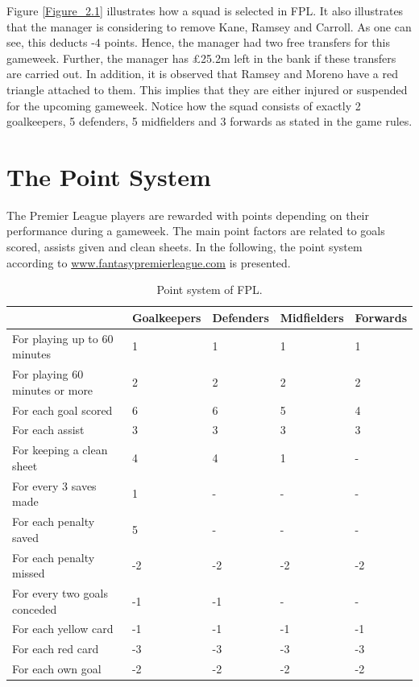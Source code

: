 Figure \ref{Figure_2.1} illustrates how a squad is selected in FPL. It also illustrates that the manager is considering to remove Kane, Ramsey and Carroll. As one can see, this deducts -4 points. Hence, the manager had two free transfers for this gameweek. Further, the manager has \pounds 25.2m left in the bank if these transfers are carried out. In addition, it is observed that Ramsey and Moreno have a red triangle attached to them. This implies that they are either injured or suspended for the upcoming gameweek. Notice how the squad consists of exactly 2 goalkeepers, 5 defenders, 5 midfielders and 3 forwards as stated in the game rules. 


\section{The Point System} \label{point_system}
The Premier League players are rewarded with points depending on their performance during a gameweek. The main point factors are related to goals scored, assists given and clean sheets. In the following, the point system according to \url{www.fantasypremierleague.com} is presented. 

\begin{table}[H]
\centering
\small
\begin{tabular}{|l|l|l|l|l|}
\hline
                               & Goalkeepers & Defenders & Midfielders & Forwards \\
\hline
For playing up to 60 minutes   & 1           & 1         & 1           & 1        \\
For playing 60 minutes or more & 2           & 2         & 2           & 2        \\
For each goal scored           & 6           & 6         & 5           & 4        \\
For each assist                & 3           & 3         & 3           & 3        \\
For keeping a clean sheet      & 4           & 4         & 1           & -        \\
For every 3 saves made         & 1           & -         & -           & -        \\
For each penalty saved         & 5           & -         & -           & -        \\
For each penalty missed        & -2          & -2        & -2          & -2       \\
For every two goals conceded   & -1          & -1        & -           & -        \\
For each yellow card           & -1          & -1        & -1          & -1       \\
For each red card              & -3          & -3        & -3          & -3       \\
For each own goal              & -2          & -2        & -2          & -2      \\
\hline
\end{tabular}
\caption{Point system of FPL.}
\end{table}

